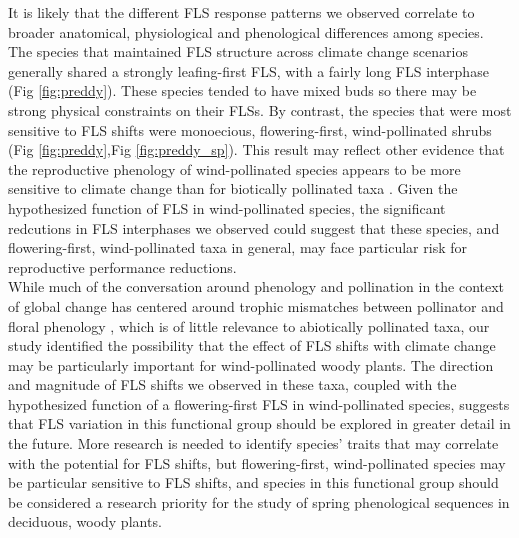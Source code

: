\documentclass[11pt]{article}\usepackage[]{graphicx}\usepackage[]{color}
\begin{document}
\noindent It is likely that the different FLS response patterns we observed correlate to broader anatomical, physiological and phenological differences among species. The species that maintained FLS structure across climate change scenarios generally shared a strongly leafing-first FLS, with a fairly long FLS interphase (Fig \ref{fig:preddy}). These species tended to have mixed buds so there may be strong physical constraints on their FLSs. By contrast, the species that were most sensitive to FLS shifts were monoecious, flowering-first, wind-pollinated shrubs (Fig \ref{fig:preddy},Fig \ref{fig:preddy_sp}). This result may reflect other evidence that the reproductive phenology of wind-pollinated species appears to be more sensitive to climate change than for biotically pollinated taxa \citep{Ziello:2012aa}. Given the hypothesized function of FLS in wind-pollinated species, the significant redcutions in FLS interphases we observed could suggest that these species, and flowering-first, wind-pollinated taxa in general, may face particular risk for reproductive performance reductions.\\

\noindent While much of the conversation around phenology and pollination in the context of global change has centered around trophic mismatches between pollinator and floral phenology \citep{Memmott2007}, which is of little relevance to abiotically pollinated taxa, our study identified the possibility that the effect of FLS shifts with climate change may be particularly important for wind-pollinated woody plants. The direction and magnitude of FLS shifts we observed in these taxa, coupled with the hypothesized function of a flowering-first FLS in wind-pollinated species, suggests that FLS variation in this functional group should be explored in greater detail in the future. More research is needed to identify species' traits that may correlate with the potential for FLS shifts, but flowering-first, wind-pollinated species may be particular sensitive to FLS shifts, and species in this functional group should be considered a research priority for the study of spring phenological sequences in deciduous, woody plants.\\ 


 
\end{document}
